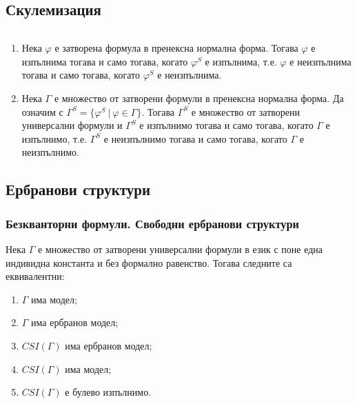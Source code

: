 \documentclass{article}
\begin{document}
\subsection*{Скулемизация}

\begin{thm}
$\ $

\begin{enumerate}
\item Нека $\varphi$ е затворена формула в пренексна нормална форма. Тогава $\varphi$ е изпълнима тогава и само тогава, когато $\varphi^S$ е изпълнима, т.е. $\varphi$ е неизпълнима тогава и само тогава, когато $\varphi^S$ е неизпълнима.

\item Нека $\Gamma$ е множество от затворени формули в пренексна нормална форма. Да означим с $\Gamma^S = \{\varphi^S\ |\ \varphi \in \Gamma\}$. Тогава $\Gamma^S$ е множество от затворени универсални формули и $\Gamma^S$ е изпълнимо тогава и само тогава, когато $\Gamma$ е изпълнимо, т.е. $\Gamma^S$ е неизпълнимо тогава и само тогава, когато $\Gamma$ е неизпълнимо.

\end{enumerate}

\end{thm}


\subsection*{Ербранови структури}

\subsubsection*{Безкванторни формули. Свободни ербранови структури}

\begin{thm}
Нека $\Gamma$ е множество от затворени универсални формули в език с поне една индивидна константа и без формално равенство. Тогава следните са еквивалентни:
\begin{enumerate}
\item $\Gamma$ има модел;
\item $\Gamma$ има ербранов модел;
\item $CSI(\Gamma)$ има ербранов модел;
\item $CSI(\Gamma)$ има модел;
\item $CSI(\Gamma)$ е булево изпълнимо.
\end{enumerate}
\end{thm}
\end{document}
